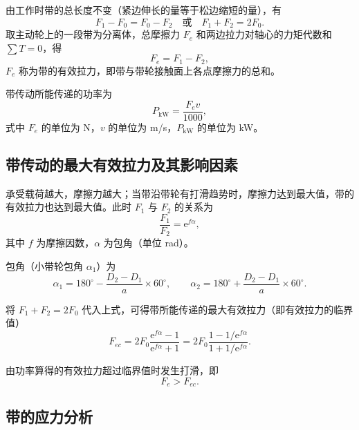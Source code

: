 由工作时带的总长度不变（紧边伸长的量等于松边缩短的量），有
\begin{equation}
	F_1-F_0=F_0-F_2
	\quad\text{或}\quad
	F_1+F_2=2F_0.
	\label{eq:带传动:紧松边拉力}
\end{equation}
取主动轮上的一段带为分离体，总摩擦力 $F_e$ 和两边拉力对轴心的力矩代数和 $\sum T=0$，得
\begin{equation}
	F_e=F_1-F_2,
	\label{eq:带传动:有效拉力}
\end{equation}
$F_e$ 称为带的有效拉力，即带与带轮接触面上各点摩擦力的总和。

带传动所能传递的功率为
\begin{equation}
	P_{\mathrm{kW}}=\frac{F_e v}{1000},
	\label{eq:带传动:功率}
\end{equation}
式中 $F_e$ 的单位为 N，$v$ 的单位为 m/s，$P_{\mathrm{kW}}$ 的单位为 kW。

\subsection{带传动的最大有效拉力及其影响因素}
\label{sec:带传动:最大有效拉力}

承受载荷越大，摩擦力越大；当带沿带轮有打滑趋势时，摩擦力达到最大值，带的有效拉力也达到最大值。此时 $F_1$ 与 $F_2$ 的关系为
\begin{equation}
	\frac{F_1}{F_2}=\mathrm{e}^{f\alpha},
	\label{eq:带传动:欧拉公式}
\end{equation}
其中 $f$ 为摩擦因数，$\alpha$ 为包角（单位 rad）。

包角（小带轮包角 $\alpha_1$）为
\begin{equation}
	\alpha_1=180^{\circ}-\frac{D_2-D_1}{a}\times 60^{\circ},\qquad
	\alpha_2=180^{\circ}+\frac{D_2-D_1}{a}\times 60^{\circ}.
	\label{eq:带传动:包角}
\end{equation}

将 $F_1+F_2=2F_0$ 代入上式，可得带所能传递的最大有效拉力（即有效拉力的临界值）
\begin{equation}
	F_{ec}=2F_0\frac{\mathrm{e}^{f\alpha}-1}{\mathrm{e}^{f\alpha}+1}
	=2F_0\frac{1-1/\mathrm{e}^{f\alpha}}{1+1/\mathrm{e}^{f\alpha}}.
	\label{eq:带传动:最大有效拉力}
\end{equation}

\begin{warnbox}[打滑条件]
	由功率算得的有效拉力超过临界值时发生打滑，即
	\[
	F_e>F_{ec}.
	\]
\end{warnbox}

\subsection{带的应力分析}
\label{sec:带传动:应力分析}

